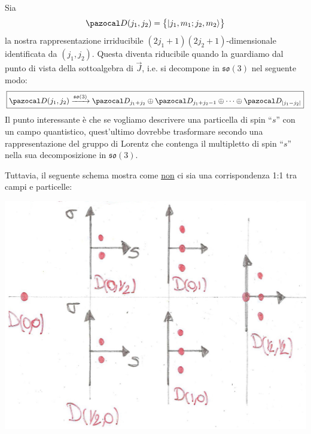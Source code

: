 \documentclass[../main.tex]{subfiles}
\begin{document}
Sia 
\[
\pazocal D (j_1,j_2) = \big\{ | j_1, m_1; j_2,m_2 \rangle \big\}
\]
la nostra rappresentazione irriducibile $(2j_1+1)(2j_2+1)$-dimensionale identificata da $(j_1,j_2)$. Questa diventa riducibile quando la guardiamo dal punto di vista della sottoalgebra di $\Vec{J}$, i.e. si decompone in $\mathfrak{so}(3)$ nel seguente modo:
\[
\boxed{\pazocal D (j_1,j_2) \xrightarrow[]{\mathfrak{so}(3)}\pazocal D_{j_1+j_2} \oplus \pazocal D_{j_1+j_2-1} \oplus \cdots \oplus \pazocal D_{|j_1-j_2|}}
\]
Il punto interessante è che se vogliamo descrivere una particella di spin “$s$” con un campo quantistico, quest'ultimo dovrebbe trasformare secondo una rappresentazione del gruppo di Lorentz che contenga il multipletto di spin “$s$” nella sua decomposizione in $\mathfrak{so}(3)$.

Tuttavia, il seguente schema mostra come \underline{non} ci sia una corrispondenza 1:1 tra campi e particelle:

\includegraphics[]{images_ch7/repscheme.jpg}
\end{document}
